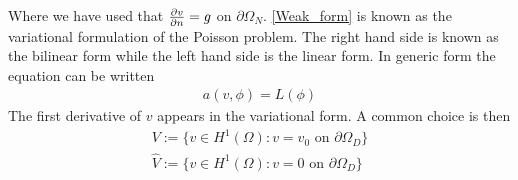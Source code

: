 Where we have used that $\frac{\partial v}{\partial n} = g$ on $\partial \Omega_N$. \eqref{Weak_form} is known as the variational formulation of the Poisson problem.  The right hand side is known as the bilinear form while the left hand side is the linear form. In generic form the equation can be written
\begin{align}
a(v,\phi) = L(\phi) \label{Bilinear}
\end{align}
The first derivative of $v$ appears in the variational form. A common choice is then
\begin{align}
 V := \{ v \in H^1(\Omega) : v = v_0 \text{ on } \partial \Omega_D \} \\
 \hat{V} := \{ v \in H^1(\Omega) : v = 0 \text{ on } \partial \Omega_D \}
\end{align}



